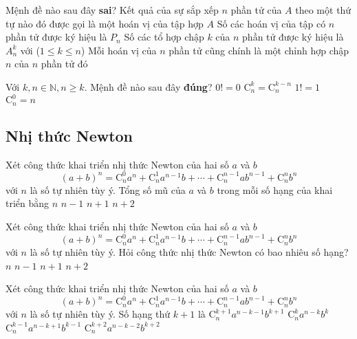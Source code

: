 \begin{ex}%
	Mệnh đề nào sau đây \textbf{sai}?
	\choice
	{Kết quả của sự sắp xếp $n$ phần tử của $A$ theo một thứ tự nào đó được gọi là một hoán vị của tập hợp $A$}
	{Số các hoán vị của tập có $n$ phần tử được ký hiệu là $P_n$}
	{\True Số các tổ hợp chập $k$ của $n$ phần tử được ký hiệu là $A^k_n$ với ($1\leq k\leq n$)}
	{Mỗi hoán vị của $n$ phần tử cũng chính là một chỉnh hợp chập $n$ của $n$ phần tử đó}
\end{ex}
\begin{ex}
	Với $ k,n\in \mathbb{N}, n\ge k $. Mệnh đề nào sau đây \textbf{đúng}?
	\choice
	{$0!=0$}
	{$\mathrm{C}_n^k=\mathrm{C}_n^{k-n}$}
	{\True $1!=1$}
	{$\mathrm{C}_n^0=n$}
\end{ex}

\subsection{Nhị thức Newton}
\begin{ex}%
	Xét công thức khai triển nhị thức Newton của hai số $a$ và $b$
	$$\left(a+b\right)^n=\mathrm{C}^0_na^n+\mathrm{C}^1_na^{n-1}b+\cdots+\mathrm{C}^{n-1}_nab^{n-1}+\mathrm{C}^n_nb^n$$
	với $n$ là số tự nhiên tùy ý. Tổng số mũ của $a$ và $b$ trong mỗi số hạng của khai triển bằng
	\choice
	{\True $n$}
	{$n-1$}
	{ $n+1$}
	{$n+2$}
	\loigiai{
	}
\end{ex}
\begin{ex}%
	Xét công thức khai triển nhị thức Newton của hai số $a$ và $b$
	$$\left(a+b\right)^n=\mathrm{C}^0_na^n+\mathrm{C}^1_na^{n-1}b+\cdots+\mathrm{C}^{n-1}_nab^{n-1}+\mathrm{C}^n_nb^n$$
	với $n$ là số tự nhiên tùy ý. Hỏi công thức nhị thức Newton có bao nhiêu số hạng?
	\choice
	{$n$}
	{$n-1$}
	{\True $n+1$}
	{$n+2$}
	\loigiai{
	}
\end{ex}
\begin{ex}%
	Xét công thức khai triển nhị thức Newton của hai số $a$ và $b$
	$$\left(a+b\right)^n=\mathrm{C}^0_na^n+\mathrm{C}^1_na^{n-1}b+\cdots+\mathrm{C}^{n-1}_nab^{n-1}+\mathrm{C}^n_nb^n$$
	với $n$ là số tự nhiên tùy ý. Số hạng thứ $k+1$ là
	\choice
	{ $\mathrm{C}^{k+1}_{n}a^{n-k-1}b^{k+1}$}
	{\True $\mathrm{C}^{k}_{n}a^{n-k}b^k$}
	{ $\mathrm{C}^{k-1}_{n}a^{n-k+1}b^{k-1}$}
	{$\mathrm{C}^{k+2}_{n}a^{n-k-2}b^{k+2}$}
	\loigiai{
	}
\end{ex}

